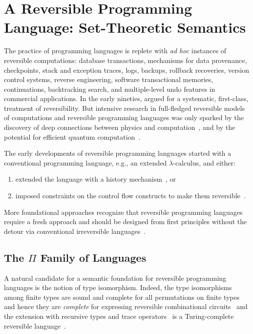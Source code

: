\section{A Reversible Programming Language: Set-Theoretic Semantics}
\label{sec:reversibleone}

The practice of programming languages is replete with \emph{ad hoc} instances of reversible computations: database
transactions, mechanisms for data provenance, checkpoints, stack and exception traces, logs, backups, rollback
recoveries, version control systems, reverse engineering, software transactional memories, continuations, backtracking
search, and multiple-level undo features in commercial applications. In the early nineties,
\citet{Baker:1992:LLL,Baker:1992:NFT} argued for a systematic, first-class, treatment of reversibility. But intensive
research in full-fledged reversible models of computations and reversible programming languages was only sparked by the
discovery of deep connections between physics and
computation~\cite{Landauer:1961,PhysRevA.32.3266,Toffoli:1980,bennett1985fundamental,Frank:1999:REC:930275, Hey:1999:FCE:304763,fredkin1982conservative}, and by the
potential for efficient quantum computation~\cite{springerlink:10.1007/BF02650179}.

The early developments of reversible programming languages started
with a conventional programming language, e.g., an extended
$\lambda$-calculus, and either:
\begin{enumerate}
\item extended the language with a history
mechanism~\cite{vanTonder:2004,Kluge:1999:SEMCD,lorenz,danos2004reversible}, or
\item imposed constraints on the control flow constructs to make them
reversible~\cite{Yokoyama:2007:RPL:1244381.1244404}.
\end{enumerate}
More foundational approaches recognize that reversible programming languages require a fresh approach and should be
designed from first principles without the detour via conventional irreversible
languages~\cite{Yokoyama:2008:PRP,Mu:2004:ILRC,abramsky2005structural,DiPierro:2006:RCL:1166042.1166047,
  rc2011,James:2012:IE:2103656.2103667,Carette2016}.

\subsection{The $\Pi$ Family of Languages}

A natural candidate for a semantic foundation for reversible programming languages is the notion of type
isomorphism. Indeed, the type isomorphisms among finite types are sound and complete for all permutations on finite
types~\cite{Fiore:2004,fiore-remarks} and hence they are \emph{complete} for expressing reversible combinational
circuits~\cite{fredkin1982conservative, James:2012:IE:2103656.2103667,Toffoli:1980} and the extension with recursive
types and trace operators~\cite{Hasegawa:1997:RCS:645893.671607} is a Turing-complete reversible
language~\cite{James:2012:IE:2103656.2103667,rc2011}.

